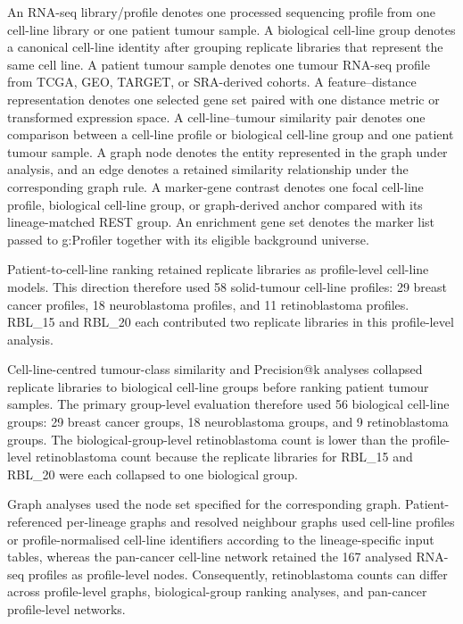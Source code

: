 An RNA-seq library/profile denotes one processed sequencing profile from one cell-line library or one patient tumour sample. A biological cell-line group denotes a canonical cell-line identity after grouping replicate libraries that represent the same cell line. A patient tumour sample denotes one tumour RNA-seq profile from TCGA, GEO, TARGET, or SRA-derived cohorts. A feature--distance representation denotes one selected gene set paired with one distance metric or transformed expression space. A cell-line--tumour similarity pair denotes one comparison between a cell-line profile or biological cell-line group and one patient tumour sample. A graph node denotes the entity represented in the graph under analysis, and an edge denotes a retained similarity relationship under the corresponding graph rule. A marker-gene contrast denotes one focal cell-line profile, biological cell-line group, or graph-derived anchor compared with its lineage-matched REST group. An enrichment gene set denotes the marker list passed to g:Profiler together with its eligible background universe.

Patient-to-cell-line ranking retained replicate libraries as profile-level cell-line models. This direction therefore used 58 solid-tumour cell-line profiles: 29 breast cancer profiles, 18 neuroblastoma profiles, and 11 retinoblastoma profiles. RBL\_15 and RBL\_20 each contributed two replicate libraries in this profile-level analysis.

Cell-line-centred tumour-class similarity and Precision@k analyses collapsed replicate libraries to biological cell-line groups before ranking patient tumour samples. The primary group-level evaluation therefore used 56 biological cell-line groups: 29 breast cancer groups, 18 neuroblastoma groups, and 9 retinoblastoma groups. The biological-group-level retinoblastoma count is lower than the profile-level retinoblastoma count because the replicate libraries for RBL\_15 and RBL\_20 were each collapsed to one biological group.

Graph analyses used the node set specified for the corresponding graph. Patient-referenced per-lineage graphs and resolved neighbour graphs used cell-line profiles or profile-normalised cell-line identifiers according to the lineage-specific input tables, whereas the pan-cancer cell-line network retained the 167 analysed RNA-seq profiles as profile-level nodes. Consequently, retinoblastoma counts can differ across profile-level graphs, biological-group ranking analyses, and pan-cancer profile-level networks.

